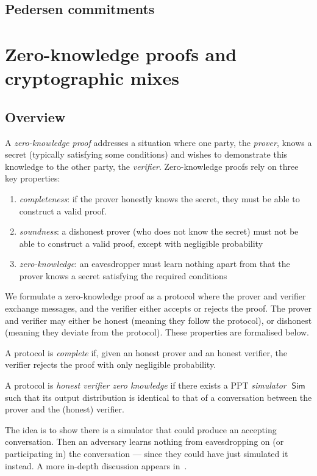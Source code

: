 \documentclass[11pt,twoside,a4paper]{article}
\DeclareMathOperator{\Sim}{\mathsf{Sim}}
\theoremstyle{definition}
\begin{document}
\subsection{Pedersen commitments}
\newpage
\section{Zero-knowledge proofs and cryptographic mixes}\label{app-proof}
\subsection{Overview}
A \textit{zero-knowledge proof} addresses a situation where one party, the \textit{prover}, knows a secret (typically satisfying some conditions) and wishes to demonstrate this knowledge to the other party, the \textit{verifier}. Zero-knowledge proofs rely on three key properties:
\begin{enumerate}
    \item \textit{completeness}: if the prover honestly knows the secret, they must be able to construct a valid proof.
    \item \textit{soundness}: a dishonest prover (who does not know the secret) must not be able to construct a valid proof, except with negligible probability
    \item \textit{zero-knowledge}: an eavesdropper must learn nothing apart from that the prover knows a secret satisfying the required conditions
\end{enumerate}
We formulate a zero-knowledge proof as a protocol where the prover and verifier exchange messages, and the verifier either accepts or rejects the proof. The prover and verifier may either be honest (meaning they follow the protocol), or dishonest (meaning they deviate from the protocol). These properties are formalised below.
\begin{definition}[Complete]
    A protocol is \textit{complete} if, given an honest prover and an honest verifier, the verifier rejects the proof with only negligible probability.
\end{definition}
\begin{definition}
    A protocol is \textit{honest verifier zero knowledge} if there exists a PPT \textit{simulator} \(\Sim\) such that its output distribution is identical to that of a conversation between the prover and the (honest) verifier.
\end{definition}
The idea is to show there is a simulator that could produce an accepting conversation. Then an adversary learns nothing from eavesdropping on (or participating in) the conversation --- since they could have just simulated it instead. A more in-depth discussion appears in~\cite{boneh2020graduate}.
\end{document}

